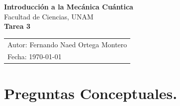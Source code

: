\documentclass[12pt,a4paper]{article}
\begin{document}
\begin{center}
    {\LARGE \textbf{Introducción a la Mecánica Cuántica}} \\[0.4cm]

    {\large Facultad de Ciencias, UNAM} \\[0.6cm]

    \large \textbf{Tarea 3} \\[0.2cm]

    \begin{tabular}{l}
        \small Autor: Fernando Naed Ortega Montero\\
        \small Fecha: \today
    \end{tabular}
\end{center}



\section*{Preguntas Conceptuales.}
\end{document}
